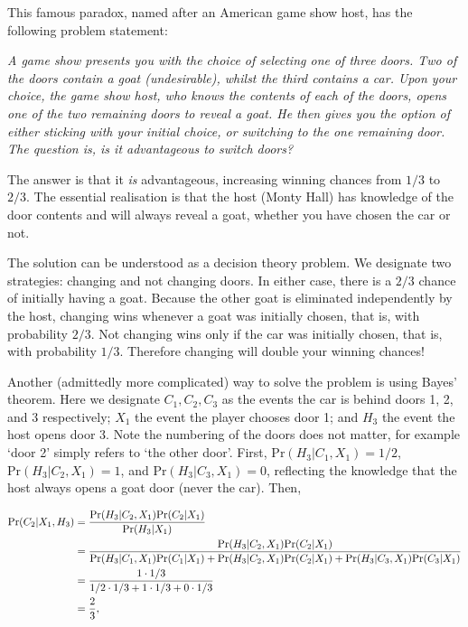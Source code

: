 \documentclass[11pt]{amsart}
\begin{document}
This famous paradox, named after an American game show host, has the following problem statement:

\emph{A game show presents you with the choice of selecting one of three doors. Two of the doors contain a goat (undesirable), whilst the third contains a car. Upon your choice, the game show host, who knows the contents of each of the doors, opens one of the two remaining doors to reveal a goat. He then gives you the option of either sticking with your initial choice, or switching to the one remaining door. The question is, is it advantageous to switch doors?}

The answer is that it \emph{is} advantageous, increasing winning chances from $1/3$ to $2/3$. The essential realisation is that the host (Monty Hall) has knowledge of the door contents and will always reveal a goat, whether you have chosen the car or not.

The solution can be understood as a decision theory problem. We designate two strategies: changing and not changing doors. In either case, there is a $2/3$ chance of initially having a goat. Because the other goat is eliminated independently by the host, changing wins whenever a goat was initially chosen, that is, with probability $2/3$. Not changing wins only if the car was initially chosen, that is, with probability $1/3$. Therefore changing will double your winning chances!

Another (admittedly more complicated) way to solve the problem is using Bayes' theorem. Here we designate $C_1, C_2, C_3$ as the events the car is behind doors 1, 2, and 3 respectively; $X_1$ the event the player chooses door 1; and $H_3$ the event the host opens door 3. Note the numbering of the doors does not matter, for example `door 2' simply refers to `the other door'. First, $\text{Pr}(H_3|C_1,X_1) = 1/2$, $\text{Pr}(H_3|C_2,X_1) = 1$, and $\text{Pr}(H_3|C_3,X_1) = 0$, reflecting the knowledge that the host always opens a goat door (never the car). Then,

\begin{align}
\text{Pr}(C_2|X_1,H_3) &= \frac{\text{Pr}(H_3|C_2,X_1)\text{Pr}(C_2|X_1)}{\text{Pr}(H_3|X_1)} \notag \\
&= \frac{\text{Pr}(H_3|C_2,X_1)\text{Pr}(C_2|X_1)}{\text{Pr}(H_3|C_1,X_1)\text{Pr}(C_1|X_1) + \text{Pr}(H_3|C_2,X_1)\text{Pr}(C_2|X_1) + \text{Pr}(H_3|C_3,X_1)\text{Pr}(C_3|X_1)} \notag \\
&= \frac{1 \cdot 1/3}{1/2 \cdot 1/3 + 1 \cdot 1/3 + 0 \cdot 1/3} \notag \\
&= \frac{2}{3}, \notag
\end{align}
\end{document}
